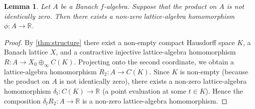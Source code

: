 \documentclass{memo-l}
\newtheorem{lem}[theorem]{Lemma}
\theoremstyle{definition}
\theoremstyle{remark}
\numberwithin{section}{chapter}
\numberwithin{equation}{chapter}
\newcommand\R{\ensuremath{\mathbb{R}}}
\newcommand{\falg}{$f\!$-algebra}
\begin{document}
\begin{lem}\label{lem:nonzero_hom}
    Let $A$ be a Banach \falg. Suppose that the product on $A$ is not
    identically zero. Then there exists a non-zero lattice-algebra
    homomorphism $\phi \colon A\to \R$.
\end{lem}
\begin{proof}
    By \cref{thm:structure} there exist a non-empty compact Hausdorff
    space $K$, a Banach lattice $X$, and a contractive injective
    lattice-algebra homomorphism $R\colon A\to X_0\oplus_\infty C(K)$.
    Projecting onto the second coordinate, we obtain a lattice-algebra
    homomorphism $R_2\colon A\to C(K)$. Since $K$ is non-empty (because the
    product on $A$ is not identically zero), there exists a non-zero
    lattice-algebra homomorphism $\delta _t\colon C(K)\to \R$ (a point
    evaluation at some $t \in K$). Hence the composition $\delta
    _tR_2\colon A\to \R$ is a non-zero lattice-algebra homomorphism.
\end{proof}
\end{document}
